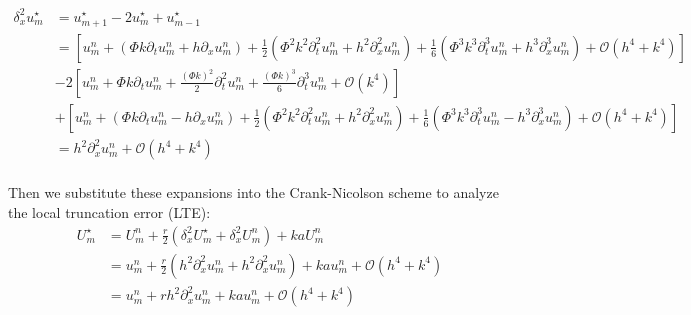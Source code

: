 \begin{align*}
  \delta_x^2 u_m^\star & = u_{m+1}^\star - 2 u_m^\star + u_{m-1}^\star                                                                                                                                                                                                                                 \\
                       & = \left[ u_m^n + \left(\Phi k \partial_t u_m^n + h \partial_x u_m^n\right) + \frac{1}{2}\left(\Phi^2 k^2 \partial_t^2 u_m^n + h^2 \partial_x^2 u_m^n\right) + \frac{1}{6}\left(\Phi^3 k^3 \partial_t^3 u_m^n + h^3 \partial_x^3 u_m^n\right) + \mathcal{O}(h^4 + k^4) \right] \\
                       & - 2 \left[ u_m^n + \Phi k \partial_t u_m^n + \frac{(\Phi k)^2}{2} \partial_t^2 u_m^n + \frac{(\Phi k)^3}{6} \partial_t^3 u_m^n + \mathcal{O}(k^4) \right]                                                                                                                     \\
                       & + \left[ u_m^n + \left(\Phi k \partial_t u_m^n - h \partial_x u_m^n\right) + \frac{1}{2}\left(\Phi^2 k^2 \partial_t^2 u_m^n + h^2 \partial_x^2 u_m^n\right) + \frac{1}{6}\left(\Phi^3 k^3 \partial_t^3 u_m^n - h^3 \partial_x^3 u_m^n\right) + \mathcal{O}(h^4 + k^4) \right] \\
                       & = h^2 \partial_x^2 u_m^n + \mathcal{O}(h^4 + k^4)                                                                                                                                                                                                                             \\
\end{align*}

Then we substitute these expansions into the Crank-Nicolson scheme to analyze the local truncation error (LTE):
\begin{align*}
  U_m^\star & = U_m^n + \frac{r}{2} \left( \delta_x^2 U_m^\star + \delta_x^2 U_m^n \right) + k a U_m^n                                  \\
            & = u_m^n + \frac{r}{2} \left( h^2 \partial_x^2 u_m^n + h^2 \partial_x^2 u_m^n \right) + k a u_m^n + \mathcal{O}(h^4 + k^4) \\
            & = u_m^n + r h^2 \partial_x^2 u_m^n + k a u_m^n + \mathcal{O}(h^4 + k^4)                                                   \\
\end{align*}


